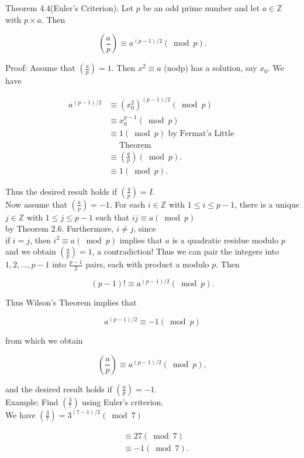 \documentclass[10pt]{article}
\begin{document}
Theorem 4.4(Euler's Criterion): Let $p$ be an odd prime number and let $a \in \mathbb{Z}$ with $p \times a$. Then

$$
\left(\frac{a}{p}\right) \equiv a^{(p-1) / 2}(\bmod p) .
$$

Proof: Assume that $\left(\frac{a}{p}\right)=1$. Then $x^{2} \equiv a$ (nodp) has a solution, say $x_{0}$. We have

$$
\begin{aligned}
a^{(p-1) / 2} & \equiv\left(x_{0}^{2}\right)^{(p-1) / 2}(\bmod p) \\
& \equiv x_{0}^{p-1}(\bmod p) \\
& \equiv 1(\bmod p) \text { by Fermat's Little } \\
& \quad \text { Theorem } \\
& \equiv\left(\frac{q}{p}\right)(\bmod p) . \\
& \equiv 1(\bmod p) .
\end{aligned}
$$

Thus the desired result holds if $\left(\frac{q}{p}\right)=I$.\\
Now assume that $\left(\frac{a}{p}\right)=-1$. For each $i \in \mathbb{Z}$ with $1 \leq i \leq p-1$, there is a unique $j \in \mathbb{Z}$ with $1 \leqslant j \leqslant p-1$ such that $i j \equiv a(\bmod p)$\\
by Theorem 2.6. Furthermore, $i \neq j$, since\\
if $i=j$, then $i^{2} \equiv a(\bmod p)$ implies that $a$ is a quadratic residue modulo $p$ and we obtain $\left(\frac{a}{p}\right)=1$, a contradiction! Thus we can pair the integers into $1,2, \ldots, p-1$ into $\frac{p-1}{2}$ pairs, each with product a modulo $p$. Then

$$
(p-1)!\equiv a^{(p-1) / 2}(\bmod p) .
$$

Thus Wilson's Theorem implies that

$$
a^{(p-1) / 2} \equiv-1(\bmod p)
$$

from which we obtain

$$
\left(\frac{a}{p}\right) \equiv a^{(p-1) / 2}(\bmod p),
$$

and the desired result holds if $\left(\frac{a}{p}\right)=-1$.\\
Example: Find $\left(\frac{3}{7}\right)$ using Euler's criterion.\\
We have $\left(\frac{3}{7}\right)=3^{(7-1) / 2}(\bmod 7)$

$$
\begin{aligned}
& \equiv 27(\bmod 7) \\
& \equiv-1(\bmod 7) .
\end{aligned}
$$
\end{document}
